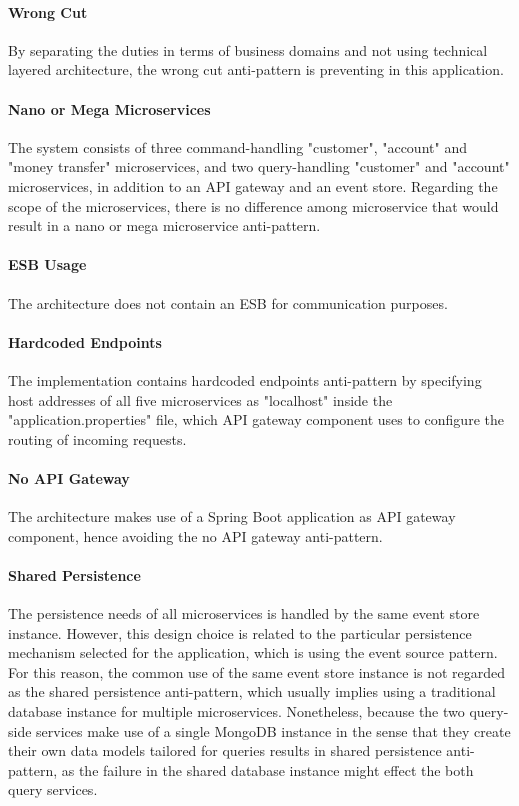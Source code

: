 \documentclass{Configuration_Files/PoliMi3i_thesis}
\begin{document}
\paragraph{Wrong Cut} By separating the duties in terms of business domains and not using technical layered architecture, the wrong cut anti-pattern is preventing in this application.

\paragraph{Nano or Mega Microservices} The system consists of three command-handling "customer", "account" and "money transfer" microservices,  and two query-handling "customer" and "account" microservices, in addition to an API gateway and an event store.
Regarding the scope of the microservices, there is no difference among microservice that would result in a nano or mega microservice anti-pattern.

\paragraph{ESB Usage} The architecture does not contain an ESB for communication purposes.

\paragraph{Hardcoded Endpoints} The implementation contains hardcoded endpoints anti-pattern by specifying host addresses of all five microservices as "localhost" inside the "application.properties" file, which API gateway component uses to configure the routing of incoming requests.

\paragraph{No API Gateway} The architecture makes use of a Spring Boot application as API gateway component, hence avoiding the no API gateway anti-pattern.

\paragraph{Shared Persistence} The persistence needs of all microservices is handled by the same event store instance.
However, this design choice is related to the particular persistence mechanism selected for the application, which is using the event source pattern.
For this reason, the common use of the same event store instance is not regarded as the shared persistence anti-pattern, which usually implies using a traditional database instance for multiple microservices. 
Nonetheless, because the two query-side services make use of a single MongoDB instance in the sense that they create their own data models tailored for queries results in shared persistence anti-pattern, as the failure in the shared database instance might effect the both query services.
\end{document}

